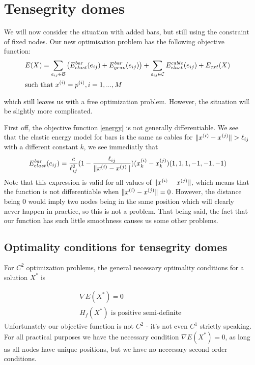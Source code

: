 \section{Tensegrity domes}
We will now consider the situation with added bars, but still using the constraint of fixed nodes. Our new optimisation problem has the following objective function:
\begin{equation}
\begin{aligned}
    \label{energy}
    &E(X) = \sum\limits_{e_{ij} \in \mathcal{B}}\big(E^{bar}_{elast}(e_{ij}) + E^{bar}_{grav}(e_{ij})\big) + \sum\limits_{e_{ij} \in \mathcal{C}} E^{cable}_{elast}(e_{ij}) + E_{ext}(X) \\
    & \text{such that } x^{(i)} = p^{(i)}, i=1,...,M
\end{aligned}
\end{equation}

which still leaves us with a free optimization problem. However, the situation will be slightly more complicated.

First off, the objective function \eqref{energy} is not generally differentiable. We see that the elastic energy model for bars is the same as cables for $\lVert x^{(i)} - x^{(j)}\rVert > \ell_{ij}$ with a different constant $k$, we see immediatly that
\begin{equation*}
E^{bar}_{elast}(e_{ij}) = \frac{c}{\ell_{ij}^2} (1- \frac{\ell_{ij}}{\lVert x^{(i)} - x^{(j)}\rVert}) (x_k^{(i)} - x_k^{(j)}) ( 1, 1, 1,-1,-1,-1)
\end{equation*}
Note that this expression is valid for all values of $\lVert x^{(i)} - x^{(j)}\rVert$, which means that the function is not differentiable when $\lVert x^{(i)} - x^{(j)}\rVert = 0$. However, the distance being $0$ would imply two nodes being in the same position which will clearly never happen in practice, so this is not a problem. That being said, the fact that our function has such little smoothness causes us some other problems.

\subsection{Optimality conditions for tensegrity domes}
For $C^2$ optimization problems, the general necessary optimality conditions for a solution $X^*$ is

\begin{align*}
    &\nabla E(X^*) = 0\\
    & H_f(X^*) \text{ is positive semi-definite}
\end{align*}
Unfortunately our objective function is not $C^2$ - it's not even $C^1$ strictly speaking. For all practical purposes we have the necessary condition $\nabla E(X^*) = 0$, as long as all nodes have unique positions, but we have no neccesary second order conditions.

